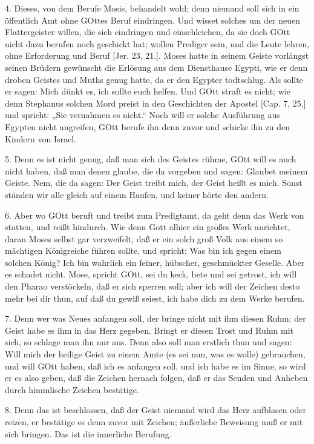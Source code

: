4. Dieses, von dem Berufe Mosis, behandelt wohl; denn niemand soll sich in ein öffentlich Amt ohne GOttes Beruf eindringen. Und wisset solches um der neuen Flattergeister willen, die sich eindringen und einschleichen, da sie doch GOtt nicht dazu berufen noch geschickt hat; wollen Prediger sein, und die Leute lehren, ohne Erforderung und Beruf [Jer. 23, 21.]. Moses hatte in seinem Geiste vorlängst seinen Brüdern gewünscht die Erlösung aus dem Diensthause Egypti, wie er denn droben Geistes und Muths genug hatte, da er den Egypter todtschlug. Als sollte er sagen: Mich dünkt es, ich sollte euch helfen. Und GOtt straft es nicht; wie denn Stephanus solchen Mord preist in den Geschichten der Apostel [Cap. 7, 25.] und spricht: „Sie vernahmen es nicht.“ Noch will er solche Ausführung aus Egypten nicht angreifen, GOtt berufe ihn denn zuvor und schicke ihn zu den Kindern von Israel.

5. Denn es ist nicht genug, daß man sich des Geistes rühme, GOtt will es auch nicht haben, daß man denen glaube, die da vorgeben und sagen: Glaubet meinem Geiste. Nem, die da sagen: Der Geist treibt mich, der Geist heißt es mich. Sonst ständen wir alle gleich auf einem Haufen, und keiner hörte den andern.

6. Aber wo GOtt beruft und treibt zum Predigtamt, da geht denn das Werk von statten, und reißt hindurch. Wie denn Gott alhier ein großes Werk anrichtet, daran Moses selbst gar verzweifelt, daß er ein solch groß Volk aus einem so mächtigen Königreiche führen sollte, und spricht: Was bin ich gegen einem solchen König? Ich bin wahrlich ein feiner, hübscher, geschmückter Geselle. Aber es schadet nicht. Mose, spricht GOtt, sei du keck, bete und sei getrost, ich will den Pharao verstöckeln, daß er sich sperren soll; aber ich will der Zeichen desto mehr bei dir thun, auf daß du gewiß seiest, ich habe dich zu dem Werke berufen.

7. Denn wer was Neues anfangen soll, der bringe nicht mit ihm diesen Ruhm: der Geist habe es ihm in das Herz gegeben. Bringt er diesen Trost und Ruhm mit sich, so schlage man ihn nur aus. Denn also soll man erstlich thun und sagen: Will mich der heilige Geist zu einem Amte (es sei nun, was es wolle) gebrauchen, und will GOtt haben, daß ich es anfangen soll, und ich habe es im Sinne, so wird er es also geben, daß die Zeichen hernach folgen, daß er das Senden und Anheben durch himmlische Zeichen bestätige.

8. Denn das ist beschlossen, daß der Geist niemand wird das Herz aufblasen oder reizen, er bestätige es denn zuvor mit Zeichen; äußerliche Beweisung muß er mit sich bringen. Das ist die innerliche Berufung.

